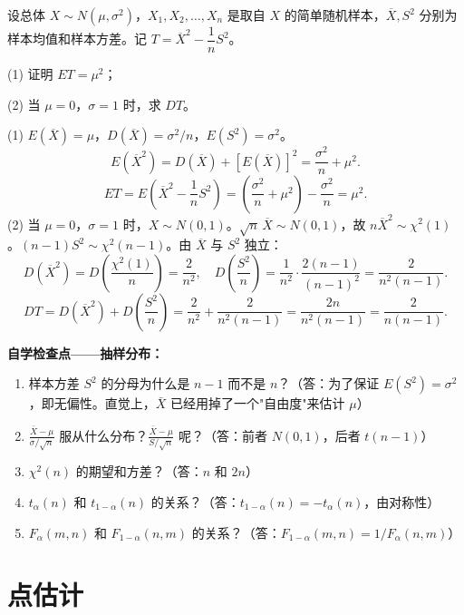 ﻿\documentclass[lang=cn,11pt]{elegantbook}
\begin{document}
\begin{exercise}\label{exer:6-ET-DT}
设总体 \(X \sim N(\mu, \sigma^2)\)，\(X_1, X_2, \dots, X_n\) 是取自 \(X\) 的简单随机样本，\(\overline{X}, S^2\) 分别为样本均值和样本方差。记 \(T = \overline{X}^2 - \dfrac{1}{n}S^2\)。\par
(1) 证明 \(ET = \mu^2\)；\par
(2) 当 \(\mu = 0\)，\(\sigma = 1\) 时，求 \(DT\)。
\end{exercise}
\begin{solution}
(1) \(E(\overline{X}) = \mu\)，\(D(\overline{X}) = \sigma^2/n\)，\(E(S^2) = \sigma^2\)。
\[
E(\overline{X}^2) = D(\overline{X}) + [E(\overline{X})]^2 = \frac{\sigma^2}{n} + \mu^2.
\]
\[
ET = E\!\left(\overline{X}^2 - \frac{1}{n}S^2\right) = \left(\frac{\sigma^2}{n} + \mu^2\right) - \frac{\sigma^2}{n} = \mu^2. 
\]
(2) 当 \(\mu=0\)，\(\sigma=1\) 时，\(X \sim N(0,1)\)。\(\sqrt{n}\,\overline{X} \sim N(0,1)\)，故 \(n\overline{X}^2 \sim \chi^2(1)\)。\((n-1)S^2 \sim \chi^2(n-1)\)。由 \(\overline{X}\) 与 \(S^2\) 独立：
\[
D(\overline{X}^2) = D\!\left(\frac{\chi^2(1)}{n}\right) = \frac{2}{n^2},\quad D\!\left(\frac{S^2}{n}\right) = \frac{1}{n^2}\cdot\frac{2(n-1)}{(n-1)^2} = \frac{2}{n^2(n-1)}.
\]
\[
DT = D(\overline{X}^2) + D\!\left(\frac{S^2}{n}\right) = \frac{2}{n^2} + \frac{2}{n^2(n-1)} = \frac{2n}{n^2(n-1)} = \frac{2}{n(n-1)}.
\]
\end{solution}

\begin{note}
\textbf{自学检查点——抽样分布：}
\begin{enumerate}
    \item 样本方差 $S^2$ 的分母为什么是 $n-1$ 而不是 $n$？（答：为了保证 $E(S^2)=\sigma^2$，即无偏性。直觉上，$\bar{X}$ 已经用掉了一个"自由度"来估计 $\mu$）
    \item $\frac{\bar{X}-\mu}{\sigma/\sqrt{n}}$ 服从什么分布？$\frac{\bar{X}-\mu}{S/\sqrt{n}}$ 呢？（答：前者 $N(0,1)$，后者 $t(n-1)$）
    \item $\chi^2(n)$ 的期望和方差？（答：$n$ 和 $2n$）
    \item $t_\alpha(n)$ 和 $t_{1-\alpha}(n)$ 的关系？（答：$t_{1-\alpha}(n)=-t_\alpha(n)$，由对称性）
    \item $F_\alpha(m,n)$ 和 $F_{1-\alpha}(n,m)$ 的关系？（答：$F_{1-\alpha}(m,n)=1/F_\alpha(n,m)$）
\end{enumerate}
\end{note}



\chapter{点估计}
\end{document}
